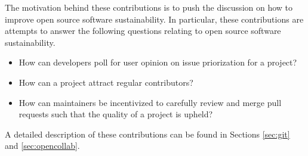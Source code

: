 The motivation behind these contributions is to push the discussion on how to
improve open source software sustainability. In particular, these contributions are
attempts to answer the following questions relating to open source software sustainability.

\begin{itemize}
  \item How can developers poll for user opinion on issue
    priorization for a project?
  \item How can a project attract regular contributors?
  \item How can maintainers be incentivized to carefully review and merge pull
    requests such that the quality of a project is upheld?
 \end{itemize}

A detailed description of these contributions can be found in Sections
\ref{sec:git} and \ref{sec:opencollab}.

